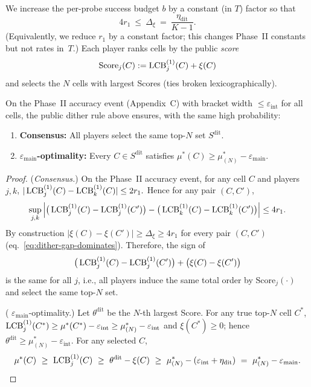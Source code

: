 We increase the per-probe success budget $b$ by a constant (in $T$) factor so that
\begin{equation}
\label{eq:dither-gap-dominates}
4r_1\ \le\ \Delta_\xi\ =\ \frac{\eta_{\mathrm{dit}}}{K-1}.
\end{equation}
(Equivalently, we reduce $r_1$ by a constant factor; this changes Phase~II constants but not rates in~$T$.) Each player ranks cells by the public \emph{score}
\[
\mathrm{Score}_j(C):=\operatorname{LCB}^{(1)}_j(C)+\xi(C)
\]
and selects the $N$ cells with largest Scores (ties broken lexicographically).

\begin{lemma}
\label{lem:dither-consensus}
On the Phase~II accuracy event (Appendix~C) with bracket width $\le \varepsilon_{\mathrm{int}}$ for all cells, the public dither rule above ensures, with the same high probability:
\begin{enumerate}
\item \textbf{Consensus:} All players select the same top-$N$ set $S^{\mathrm{dit}}$.
\item \textbf{$\varepsilon_{\text{main}}$-optimality:} Every $C\in S^{\mathrm{dit}}$ satisfies $\mu^\ast(C)\ge \mu^\ast_{(N)}-\varepsilon_{\text{main}}$.
\end{enumerate}
\end{lemma}

\begin{proof}
(\emph{Consensus.}) On the Phase~II accuracy event, for any cell $C$ and players $j,k$,
\(
|\operatorname{LCB}^{(1)}_j(C)-\operatorname{LCB}^{(1)}_k(C)|\le 2r_1.
\)
Hence for any pair $(C,C')$,
\[
\sup_{j,k}\Big|\big(\operatorname{LCB}^{(1)}_j(C)-\operatorname{LCB}^{(1)}_j(C')\big)
-\big(\operatorname{LCB}^{(1)}_k(C)-\operatorname{LCB}^{(1)}_k(C')\big)\Big|
\le 4r_1.
\]
By construction $|\xi(C)-\xi(C')|\ge \Delta_\xi\ge 4r_1$ for  {every} pair $(C,C')$ (eq.~\eqref{eq:dither-gap-dominates}). Therefore, the sign of
\[
\big(\operatorname{LCB}^{(1)}_j(C)-\operatorname{LCB}^{(1)}_j(C')\big)+\big(\xi(C)-\xi(C')\big)
\]
is the same for all $j$, i.e., all players induce the same total order by $\mathrm{Score}_j(\cdot)$ and select the same top-$N$ set.

( {$\varepsilon_{\text{main}}$-optimality.}) Let $\theta^{\mathrm{dit}}$ be the $N$-th largest Score. For any true top-$N$ cell $C^\ast$,
$\operatorname{LCB}^{(1)}_j(C^\ast)\ge \mu^\ast(C^\ast)-\varepsilon_{\mathrm{int}}\ge \mu^\ast_{(N)}-\varepsilon_{\mathrm{int}}$ and $\xi(C^\ast)\ge 0$; hence $\theta^{\mathrm{dit}}\ge \mu^\ast_{(N)}-\varepsilon_{\mathrm{int}}$. For any selected $C$,
\[
\mu^\ast(C)\ \ge\ \LCB^{(1)}_j(C)\ \ge\ \theta^{\mathrm{dit}}-\xi(C)\ \ge\ \mu^\ast_{(N)}-(\varepsilon_{\mathrm{int}}+\eta_{\mathrm{dit}})\ =\ \mu^\ast_{(N)}-\varepsilon_{\text{main}}.\qedhere
\]
\end{proof}

